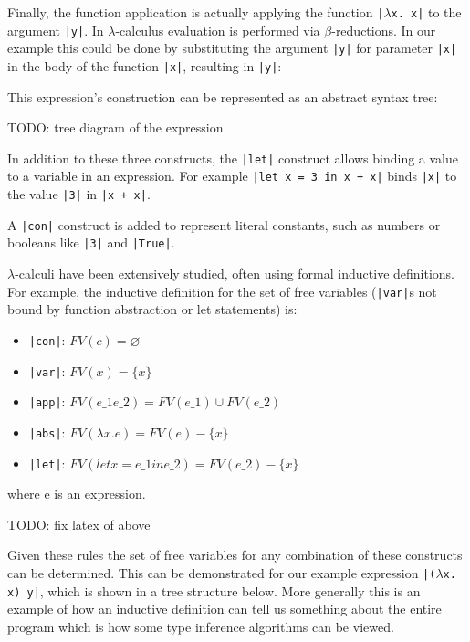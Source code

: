 \documentclass[a4paper,fleqn,12pt]{article}
\begin{document}
Finally, the function application is actually applying the function \texttt{|$\lambda$x. x|} to the argument \texttt{|y|}. In $\lambda$-calculus evaluation is performed via $\beta$-reductions. In our example this could be done by substituting the argument \texttt{|y|} for parameter \texttt{|x|} in the body of the function \texttt{|x|}, resulting in \texttt{|y|}:

This expression’s construction can be represented as an abstract syntax tree:

TODO: tree diagram of the expression

In addition to these three constructs, the \texttt{|let|} construct allows binding a value to a variable in an expression. For example \texttt{|let x = 3 in x + x|} binds \texttt{|x|} to the value \texttt{|3|} in \texttt{|x + x|}.

A \texttt{|con|} construct is added to represent literal constants, such as numbers or booleans like \texttt{|3|} and \texttt{|True|}.

$\lambda$-calculi have been extensively studied, often using formal inductive definitions. For example, the inductive definition for the set of free variables (\texttt{|var|}s not bound by function abstraction or let statements) is:
\begin{itemize}
  \item \texttt{|con|}: $FV(c) = \varnothing$
  \item \texttt{|var|}: $FV(x) = \{ x \}$
  \item \texttt{|app|}: $FV(e\_1 e\_2) = FV(e\_1) \cup FV(e\_2)$
  \item \texttt{|abs|}: $FV(\lambda x. e) = FV(e) - \{ x \}$
  \item \texttt{|let|}: $FV(let x = e\_1 in e\_2) = FV(e\_2) - \{ x \}$
\end{itemize}
where e is an expression.

TODO: fix latex of above

Given these rules the set of free variables for any combination of these constructs can be determined. This can be demonstrated for our example expression \texttt{|($\lambda$x. x) y|}, which is shown in a tree structure below. More generally this is an example of how an inductive definition can tell us something about the entire program which is how some type inference algorithms can be viewed.
\end{document}
